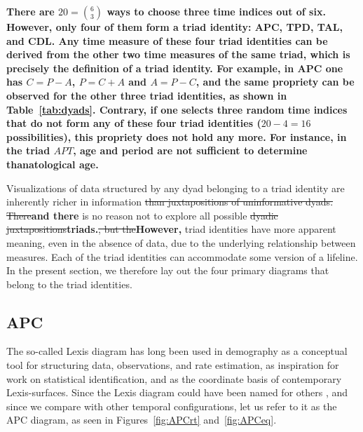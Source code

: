 \documentclass[11pt,oneside,a4paper]{article} %
\newcommand\tgh[1]{\raisebox{-.25\height}{\texttt{[image: Figures/triadtable/triad\#1.pdf]}}}
\begin{document}
\textbf{There are $20=\binom{6}{3}$ ways to choose three time indices out of six. However, only four of them form a triad identity: APC, TPD, TAL, and CDL. Any time measure of these four triad identities can be derived from the other two time measures of the same triad, which is precisely the definition of a triad identity. For example, in APC one has $C=P-A$, $P=C+A$ and $A=P-C$, and the same propriety can be observed for the other three triad identities, as shown in Table~\ref{tab:dyads}. Contrary, if one selects three random time indices that do not form any of these four triad identities ($20-4=16$ possibilities), this propriety does not hold any more. For instance, in the triad $APT$, age and period are not sufficient to determine thanatological age.}

Visualizations of data structured by any dyad belonging to a triad identity
are inherently richer in information \sout{than juxtapositions of uninformative dyads. There}\textbf{and there} is no reason not
to explore all possible \sout{dyadic juxtapositions}\textbf{triads.}\sout{, but the}\textbf{However,} triad identities have more
apparent meaning, even in the absence of data, due to the underlying
relationship between measures. Each of the triad identities can accommodate some
version of a lifeline. In the present section, we therefore lay out
the four primary diagrams that belong to the triad identities. 

\FloatBarrier
\subsection*{APC}%
\FloatBarrier
The so-called Lexis diagram has long been used in demography as a conceptual
tool for structuring data, observations, and rate estimation, as inspiration for work
on statistical identification, and as the coordinate basis of contemporary
Lexis-surfaces.
Since the Lexis diagram could have been named for others
\citep{vandeschrick2001lexis,keiding2011age}, and since we compare with other
temporal configurations, let us refer to it as the APC diagram, as seen in
Figures~\ref{fig:APCrt} and~\ref{fig:APCeq}. 
\end{document}
